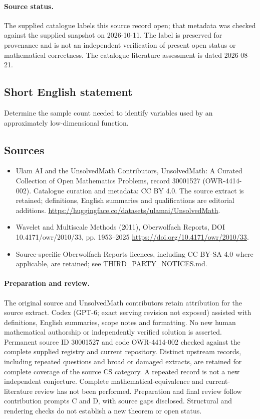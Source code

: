 \documentclass[11pt]{article}
\begin{document}
\paragraph{Source status.}
The supplied catalogue labels this source record open; that metadata was checked against the supplied snapshot on 2026-10-11. The label is preserved for provenance and is not an independent verification of present open status or mathematical correctness. The catalogue literature assessment is dated 2026-08-21.
\subsection{Short English statement}
Determine the sample count needed to identify variables used by an approximately low-dimensional function.
\subsection{Sources}
\begin{itemize}
\item[S1] Ulam AI and the UnsolvedMath Contributors, UnsolvedMath: A Curated Collection of Open Mathematics Problems, record 30001527 (OWR-4414-002). Catalogue curation and metadata: CC BY 4.0. The source extract is retained; definitions, English summaries and qualifications are editorial additions.
\url{https://huggingface.co/datasets/ulamai/UnsolvedMath}.
\item[S2] Wavelet and Multiscale Methods (2011), Oberwolfach Reports, DOI 10.4171/owr/2010/33, pp. 1953--2025
\url{https://doi.org/10.4171/owr/2010/33}.
\item Source-specific Oberwolfach Reports licences, including CC BY-SA 4.0 where applicable, are retained; see THIRD\_PARTY\_NOTICES.md.
\end{itemize}
\paragraph{Preparation and review.}
The original source and UnsolvedMath contributors retain attribution for the source extract. Codex (GPT-6; exact serving revision not exposed) assisted with definitions, English summaries, scope notes and formatting. No new human mathematical authorship or independently verified solution is asserted. Permanent source ID 30001527 and code OWR-4414-002 checked against the complete supplied registry and current repository. Distinct upstream records, including repeated questions and broad or damaged extracts, are retained for complete coverage of the source CS category. A repeated record is not a new independent conjecture. Complete mathematical-equivalence and current-literature review has not been performed. Preparation and final review follow contribution prompts C and D, with source gaps disclosed. Structural and rendering checks do not establish a new theorem or open status.
\label{end:30001527}
\end{document}
